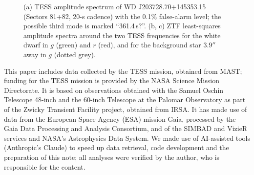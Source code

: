 \documentclass[RNAAS]{aastex631}
\begin{document}
\begin{figure}[ht!]
\caption{(a) TESS amplitude spectrum of WD J203728.70+145353.15 (Sectors 81+82, 20-s cadence) with the 0.1\%
false-alarm level; the possible third mode is marked ``361.4\,s?''. (b, c) ZTF least-squares amplitude spectra around
the two TESS frequencies for the white dwarf in $g$ (green) and $r$ (red), and for the background star 3.9$''$ away
in $g$ (dotted grey).\label{fig:1}}
\end{figure}

\begin{acknowledgments}
This paper includes data collected by the TESS mission, obtained from MAST; funding for the TESS mission is provided by
the NASA Science Mission Directorate. It is based on observations obtained with the Samuel Oschin Telescope 48-inch
and the 60-inch Telescope at the Palomar Observatory as part of the Zwicky Transient Facility project, obtained
from IRSA. It has made use of data from the European Space Agency (ESA) mission Gaia, processed by the Gaia Data
Processing and Analysis Consortium, and of the SIMBAD and VizieR services and NASA's Astrophysics Data System.
We made use of AI-assisted tools (Anthropic's Claude) to speed up data retrieval, code development and the
preparation of this note; all analyses were verified by the author, who is responsible for the content.
\end{acknowledgments}


{}

\end{document}
